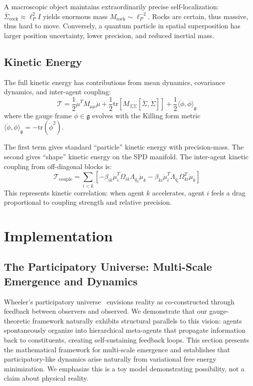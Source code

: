 \documentclass[11pt]{article}
\begin{document}
A macroscopic object maintains extraordinarily precise self-localization: $\bar{\Sigma}_{\mathrm{rock}} \approx \ell_P^2 I$ yields enormous mass $M_{\mathrm{rock}} \sim \ell_P^{-2}$. Rocks are certain, thus massive, thus hard to move. Conversely, a quantum particle in spatial superposition has larger position uncertainty, lower precision, and reduced inertial mass.

\subsection{Kinetic Energy}

The full kinetic energy has contributions from mean dynamics, covariance dynamics, and inter-agent coupling:
\begin{equation}
\mathcal{T} = \frac{1}{2}\dot{\mu}^T M_{\mu\mu} \dot{\mu} + \frac{1}{2}\mathrm{tr}\left[M_{\Sigma\Sigma}[\dot{\Sigma}, \dot{\Sigma}]\right] + \frac{1}{2}\langle\dot{\phi}, \dot{\phi}\rangle_{\mathfrak{g}}
\label{eq:full_kinetic}
\end{equation}
where the gauge frame $\phi \in \mathfrak{g}$ evolves with the Killing form metric $\langle \dot{\phi}, \dot{\phi} \rangle_{\mathfrak{g}} = -\mathrm{tr}(\dot{\phi}^2)$.

The first term gives standard ``particle'' kinetic energy with precision-mass. The second gives ``shape'' kinetic energy on the SPD manifold. The inter-agent kinetic coupling from off-diagonal blocks is:
\begin{equation}
\mathcal{T}_{\mathrm{couple}} = \sum_{i < k}\left[-\beta_{ik}\dot{\mu}_i^T \Omega_{ik}\Lambda_{q_k}\dot{\mu}_k - \beta_{ki}\dot{\mu}_i^T \Lambda_{q_i}\Omega_{ki}^T \dot{\mu}_k\right]
\end{equation}
This represents kinetic correlation: when agent $k$ accelerates, agent $i$ feels a drag proportional to coupling strength and relative precision.





\section{Implementation}


\subsection{The Participatory Universe: Multi-Scale Emergence and Dynamics}
\label{sec:participatory}

Wheeler's participatory universe~\cite{Wheeler1983} envisions reality as co-constructed through feedback between observers and observed. We demonstrate that our gauge-theoretic framework naturally exhibits structural parallels to this vision: agents spontaneously organize into hierarchical meta-agents that propagate information back to constituents, creating self-sustaining feedback loops. This section presents the mathematical framework for multi-scale emergence and establishes that participatory-like dynamics arise naturally from variational free energy minimization. We emphasize this is a toy model demonstrating possibility, not a claim about physical reality.
\end{document}
